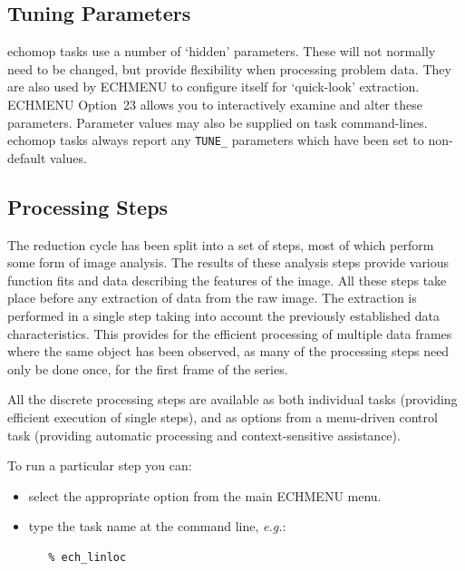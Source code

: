 \documentclass[11pt,twoside]{article}
\makeatletter
\newcommand{\xlabel}[1]{}
\newcommand{\mlabel}[1]{\xlabel{#1}\label{#1}}
\newcommand{\myindex}[1]{\index{#1}}
\newcommand{\indexcmdname}[1]{\index{#1@\protect\cmdname{#1}}}
\renewcommand{\myindex}[1]{}
\renewcommand{\indexcmdname}[1]{}
\newcommand{\cmdname}{\begingroup \catcode`\_=12 \realcmdname}
\newcommand{\realcmdname}[1]{\endgroup\texttt{#1}}
\makeatother
\begin{document}
\subsection{\mlabel{tuning_parameters}Tuning Parameters}
\myindex{Parameters!tuning}

{\sc echomop} tasks use a number of `hidden'
parameters.\myindex{Parameters!hidden}
These will not normally need to be changed, but provide flexibility when
processing problem data.  They are also used by ECHMENU to configure itself
for `quick-look' extraction. \indexcmdname{ECH_TUNER}
ECHMENU Option~23 allows you to interactively examine and alter these
parameters.  Parameter values may also be supplied on task command-lines.
{\sc echomop} tasks always report any \verb+TUNE_+ parameters which have
been set to non-default values.


\subsection{\mlabel{processing_steps}Processing Steps}

The reduction cycle has been split into a set of steps, most of which
perform some form of image analysis.  The results of these analysis steps
provide various function fits and data  describing the features of the
image. All these steps take place before any extraction of data from the
raw image. The extraction is performed in a single step taking into account
the previously established data characteristics. This provides for the
efficient processing of multiple data frames\myindex{Multiple data frames}
where the same object has been observed, as many of the processing steps
need only be done once, for the first frame of the series.

All the discrete processing steps are available as both individual tasks
(providing efficient execution of single steps), and as options from a
menu-driven control task (providing automatic processing and context-sensitive
assistance).

To run a particular step you can:

\begin{itemize}

\item select the appropriate option from the main ECHMENU menu.

\item type the task name at the command line, {\it{e.g.}}:

\begin{verbatim}
   % ech_linloc
\end{verbatim}

\end{itemize}
\end{document}
